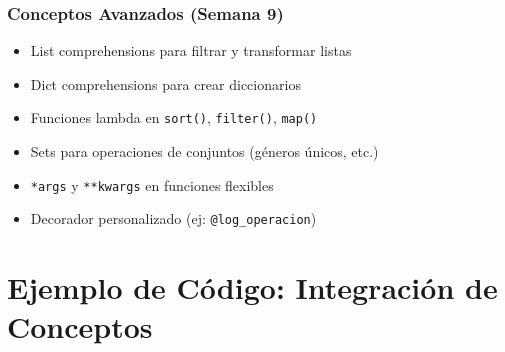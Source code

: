 \documentclass[12pt,a4paper]{article}
\begin{document}
\subsubsection{Conceptos Avanzados (Semana 9)}
\begin{itemize}[leftmargin=*]
    \item List comprehensions para filtrar y transformar listas
    \item Dict comprehensions para crear diccionarios
    \item Funciones lambda en \texttt{sort()}, \texttt{filter()}, \texttt{map()}
    \item Sets para operaciones de conjuntos (géneros únicos, etc.)
    \item \texttt{*args} y \texttt{**kwargs} en funciones flexibles
    \item Decorador personalizado (ej: \texttt{@log\_operacion})
\end{itemize}

\section{Ejemplo de Código: Integración de Conceptos}
\end{document}
